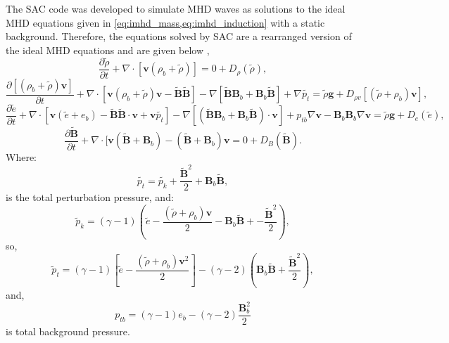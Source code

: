 The SAC code was developed to simulate MHD waves as solutions to the ideal MHD equations given in \cref{eq:imhd_mass,eq:imhd_induction} with a static background.
Therefore, the equations solved by SAC are a rearranged version of the ideal MHD equations and are given below \citep[taken from][]{shelyag2008},
\begin{equation}
\frac{\partial\tilde{\rho}}{\partial t}+\nabla\cdot[\mathbf{v}(\rho_{b}+\tilde{\rho})]=0+D_{\rho}(\tilde{\rho}),
\end{equation}
\begin{equation}
\frac{\partial[(\rho_{b}+\tilde{\rho})\mathbf{v}]}{\partial t}+\nabla\cdot[\mathbf{v}(\rho_{b}+\tilde{\rho})\mathbf{v}-\mathbf{\tilde{B}\tilde{B}}]-\nabla[\mathbf{\tilde{B}}\mathbf{B}_{b}+\mathbf{B}_{b}\mathbf{\tilde{B}}]+\nabla\tilde{p_{t}}=\tilde{\rho}\mathbf{g}+D_{\rho v}[(\tilde{\rho}+\rho_{b})\mathbf{v}],
\end{equation}
\begin{equation}
\frac{\partial\tilde{e}}{\partial t}+\nabla\cdot[\mathbf{v}(\tilde{e}+e_{b})-\mathbf{\tilde{B}\tilde{B}}\cdot\mathbf{v}+\mathbf{v}\tilde{p_{t}}]-\nabla[(\mathbf{\tilde{B}B}_{b}+\mathbf{B}_{b}\mathbf{\tilde{B}})\cdot\mathbf{v}]+p_{tb}\nabla\mathbf{v}-\mathbf{B}_{b}\mathbf{B}_{b}\nabla\mathbf{v}=\tilde{\rho}\mathbf{g}+D_{e}(\tilde{e}),
\end{equation}
\begin{equation}
\frac{\partial\mathbf{\tilde{B}}}{\partial t}+\nabla\cdot[\mathbf{v}(\mathbf{\tilde{B}}+\mathbf{B}_{b})-(\mathbf{\tilde{B}}+\mathbf{B}_{b})\mathbf{v}=0+D_{B}(\mathbf{\tilde{B}}).
\end{equation}
Where:
\begin{equation}
\tilde{p_{t}}=\tilde{p_{k}}+\frac{\tilde{\mathbf{B}}^{2}}{2}+\mathbf{B}_{b}\mathbf{\tilde{B}},
\end{equation}
is the total perturbation pressure, and: 
\begin{equation}
\tilde{p}_{k}=(\gamma-1)\left(\tilde{e}-\frac{(\tilde{\rho}+\rho_{b})\mathbf{v}}{2}-\mathbf{B}_b\mathbf{\tilde{B}}+-\frac{\tilde{\mathbf{B}}^{2}}{2}\right),
\end{equation}
so,
\begin{equation}
\tilde{p}_{t}=(\gamma-1)\left[\tilde{e}-\frac{(\tilde{\rho}+\rho_{b})\mathbf{v}^{2}}{2}\right]-(\gamma-2)\left(\mathbf{B}_{b}\mathbf{\tilde{B}}+\frac{\tilde{\mathbf{B}}^{2}}{2}\right),
\end{equation}
and,
\begin{equation}
p_{tb}=(\gamma-1)e_{b}-(\gamma-2)\frac{\mathbf{B}_{b}^{2}}{2}
\end{equation}
is total background pressure.

